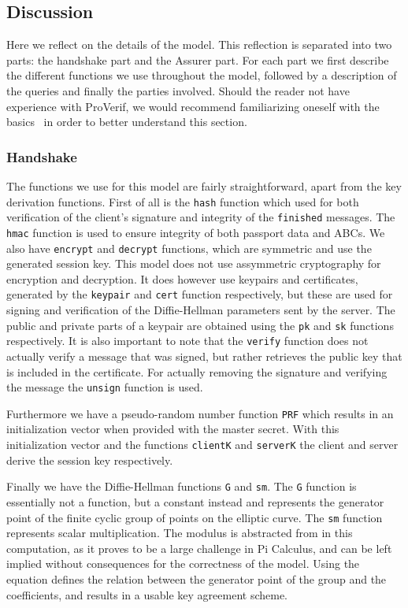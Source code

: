 \subsection{Discussion}
Here we reflect on the details of the model. This reflection is separated into two parts: the handshake part and the Assurer part. For each part we first describe the different functions we use throughout the model, followed by a description of the queries and finally the parties involved. Should the reader not have experience with ProVerif, we would recommend familiarizing oneself with the basics~\cite{proverifmanual} in order to better understand this section.

\subsubsection{Handshake}
The functions we use for this model are fairly straightforward, apart from the key derivation functions. First of all is the \texttt{hash} function which used for both verification of the client's signature and integrity of the \texttt{finished} messages. The \texttt{hmac} function is used to ensure integrity of both passport data and ABCs. We also have \texttt{encrypt} and \texttt{decrypt} functions, which are symmetric and use the generated session key. This model does not use assymmetric cryptography for encryption and decryption. It does however use keypairs and certificates, generated by the \texttt{keypair} and \texttt{cert} function respectively, but these are used for signing and verification of the Diffie-Hellman parameters sent by the server. The public and private parts of a keypair are obtained using the \texttt{pk} and \texttt{sk} functions respectively. It is also important to note that the \texttt{verify} function does not actually verify a message that was signed, but rather retrieves the public key that is included in the certificate. For actually removing the signature and verifying the message the \texttt{unsign} function is used.

Furthermore we have a pseudo-random number function \texttt{PRF} which results in an initialization vector when provided with the master secret. With this initialization vector and the functions \texttt{clientK} and \texttt{serverK} the client and server derive the session key respectively. 

Finally we have the Diffie-Hellman functions \texttt{G} and \texttt{sm}. The \texttt{G} function is essentially not a function, but a constant instead and represents the generator point of the finite cyclic group of points on the elliptic curve. The \texttt{sm} function represents scalar multiplication. The modulus is abstracted from in this computation, as it proves to be a large challenge in Pi Calculus, and can be left implied without consequences for the correctness of the model. Using the equation defines the relation between the generator point of the group and the coefficients, and results in a usable key agreement scheme.

